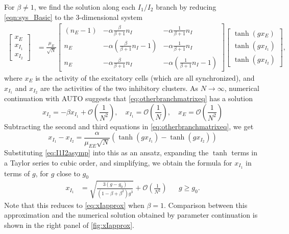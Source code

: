 \documentclass[11pt,reqno]{amsart}
\begin{document}
For $\beta \neq 1$, we find the solution along each $I_1/I_2$ branch by reducing \cref{eqn:sys_Basic} to the 3-dimensional system
\begin{equation}\label{eq:otherbranchmatrixeq}
 \begin{aligned}
 \begin{bmatrix} x_E\\x_{I_1}\\x_{I_2}\end{bmatrix} 
 &= \frac{\mu_E}{\sqrt{N}} 
 \begin{bmatrix} (n_E - 1) & -\alpha \frac{\beta}{\beta+1} n_I & - \alpha \frac{1}{\beta+1} n_I  \\
 n_E  & -\alpha \left(\frac{\beta}{\beta+1} n_I-1\right) & - \alpha \frac{1}{\beta+1} n_I  \\
 n_E  & -\alpha \frac{\beta}{\beta+1} n_I & -\alpha \left(\frac{1}{\beta+1} n_I-1\right)
 \end{bmatrix}
 \begin{bmatrix} \tanh(g x_E) \\\tanh ( g x_{I_1} ) \\\tanh(g x_{I_2})\end{bmatrix},
 \end{aligned}
 \end{equation}
 where $x_E$ is the activity of the excitatory cells (which are all synchronized), and $x_{I_1}$ and $x_{I_2}$ are the activities of the two inhibitory clusters. As $N \rightarrow \infty$, numerical continuation with AUTO suggests that \cref{eq:otherbranchmatrixeq} has a solution
\begin{equation}\label{eq:I1I2asymp}
    x_{I_2} = -\beta x_{I_1} + \mathcal{O}\left( \frac{1}{N^2} \right), \quad 
    x_{I_1} = \mathcal{O}\left( \frac{1}{N} \right), \quad
     x_E = \mathcal{O}\left( \frac{1}{N^2} \right)
\end{equation}
Subtracting the second and third equations in \cref{eq:otherbranchmatrixeq}, we get
\[
 x_{I_1} - x_{I_2} = \frac{\alpha}{\mu_{EE}\sqrt{N}}\left( \tanh(g x_{I_1}) - \tanh(g x_{I_2}) \right)
 \]
Substituting \cref{eq:I1I2asymp} into this as an ansatz, expanding the $\tanh$ terms in a Taylor series to cubic order, and simplifying, we obtain the formula for $x_{I_1}$ in terms of $g$, for $g$ close to $g_0$
 \begin{align}\label{eq:XI1}
 x_{I_1} &= \sqrt{ \frac{ 3(g - g_0) }{ (1 - \beta + \beta^2 )g^3}} + \mathcal{O}\left( \frac{1}{N^2}\right)&& g \geq g_0.
\end{align}
Note that this reduces to \cref{eq:xIapprox} when $\beta = 1$. Comparison between this approximation and the numerical solution obtained by parameter continuation is shown in the right panel of \cref{fig:xIapprox}.
\end{document}
